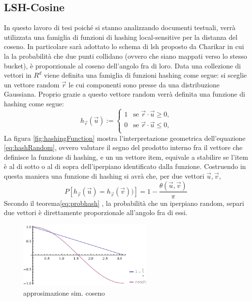 \documentclass[a4paper,12pt]{report}
\begin{document}
\subsection{LSH-Cosine}
In questo lavoro di tesi poiché si stanno analizzando documenti testuali, verrà utilizzata una famiglia di funzioni di hashing local-sensitive per la distanza del coseno. In particolare sarà adottato lo schema di lsh proposto da Charikar\cite{Charikar:2002:SET:509907.509965} in cui la   la probabilità che due punti collidano (ovvero che siano mappati verso lo stesso bucket), è proporzionale al coseno dell'angolo fra di loro. Data una collezione di vettori in $R^d$ viene definita una famiglia di funzioni hashing come segue: si sceglie un vettore random $\vec{r}$ le cui componenti sono presse da una distribuzione Gaussiana. Proprio grazie a questo vettore random verrà definita una funzione di hashing come segue:
\begin{equation}
\label{eq:hashRandom}
h_{\vec{r}}(\vec{u}):=\begin{cases}
1& \text{se  $\vec{r}\cdot \vec{u}\geq0$,}\\
0& \text{se  $\vec{r}\cdot \vec{u}\leq0$,}\\
\end{cases}
\end{equation}
La figura \ref{fig:hashingFunction} mostra l'interpretazione geometrica dell'equazione \ref{eq:hashRandom}, ovvero valutare il segno del prodotto interno fra il vettore che definisce la funzione di hashing, e un un vettore item, equivale a stabilire se 
l'item è al di sotto o al di sopra dell'iperpiano identificato dalla funzione.
Costruendo in questa maniera una funzione di hashing si avrà che, per due vettori $\vec{u},\vec{v}$,
\begin{equation}
\label{eq:probhash}
P[h_{\vec{r}}(\vec{u})=h_{\vec{r}}(\vec{v}))]=1-\frac{\theta(\vec{u},\vec{v})}{\pi}
\end{equation} 
Secondo il teorema\ref{eq:probhash} \cite{Goemans:1995:IAA:227683.227684},  la probabilità che un iperpiano random, separi due vettori è direttamente proporzionale all'angolo fra di essi. 
\begin{figure}
    \centering
\includegraphics[width=0.6\textwidth]{cosineLSH}
\caption{approsimazione sim. coseno}
\label{fig:cosApprox}
\end{figure} 
\end{document}
